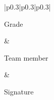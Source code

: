 \begin{titlepage}
\begin{center}
\begin{tabular}{ |p{0.3\linewidth}|p{0.3\linewidth}|p{0.3\linewidth}| }
                \begin{minipage}{\linewidth} 
                    \vspace{0.1cm} Grade \vspace{\boxsize} \\ \centerline{\Large } \vspace{\boxsize}
                \end{minipage} & 
                \begin{minipage}{\linewidth} 
                    Team member \vspace{\boxsize} \\ \centerline{\Large \memberThree} \vspace{\boxsize}
                \end{minipage} & 
                \begin{minipage}{\linewidth} 
                    Signature \vspace{\boxsize} \\ \centerline{\Large } \vspace{\boxsize}
                \end{minipage} \\ 
                \hline

                 \\ \hline

\end{tabular}
\end{center}
\end{titlepage}
